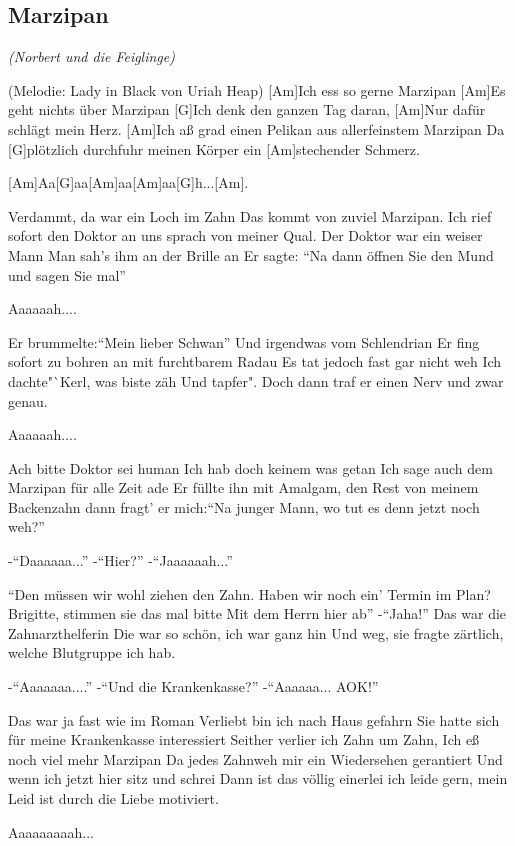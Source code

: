 \documentclass[a5paper,pagesize,twoside,10pt,headings=small]{scrreprt}
\newcommand\songheader[3][]{%
  \clearpage%
    \subsection*{\centering #2}\vspace{0.5\baselineskip}%
    \addcontentsline{toc}{subsection}{#2}
    \centering \textit{#3}\\%
    \vspace{\baselineskip}\par%
}
\begin{document}
\songheader{Marzipan}{(Norbert und die Feiglinge)}
\begin{guitar}
{\tiny(Melodie: Lady in Black von Uriah Heap)}
[Am]Ich ess so gerne Marzipan
[Am]Es geht nichts über Marzipan
[G]Ich denk den ganzen Tag daran,
[Am]Nur dafür schlägt mein Herz.
[Am]Ich aß grad einen Pelikan aus allerfeinstem Marzipan
Da [G]plötzlich durchfuhr meinen Körper ein [Am]stechender Schmerz.

[Am]Aa[G]aa[Am]aa[Am]aa[G]h...[Am].

Verdammt, da war ein Loch im Zahn
Das kommt von zuviel Marzipan.
Ich rief sofort den Doktor an uns sprach von meiner Qual.
Der Doktor war ein weiser Mann
Man sah's ihm an der Brille an
Er sagte: "`Na dann öffnen Sie den Mund und sagen Sie mal"'

Aaaaaah....

Er brummelte:"`Mein lieber Schwan"'
Und irgendwas vom Schlendrian
Er fing sofort zu bohren an mit furchtbarem Radau
Es tat jedoch fast gar nicht weh
Ich dachte"`Kerl, was biste zäh
Und tapfer". Doch dann traf er einen Nerv und zwar genau.

Aaaaaah....

Ach bitte Doktor sei human
Ich hab doch keinem was getan
Ich sage auch dem Marzipan für alle Zeit ade
Er füllte ihn mit Amalgam, den Rest von meinem Backenzahn
dann fragt' er mich:"`Na junger Mann, wo tut es denn jetzt noch weh?"'

-"`Daaaaaa..."'
-"`Hier?"'
-"`Jaaaaaah..."'

"`Den müssen wir wohl ziehen den Zahn.
Haben wir noch ein' Termin im Plan?
Brigitte, stimmen sie das mal bitte
Mit dem Herrn hier ab"' -"`Jaha!"'
Das war die Zahnarzthelferin
Die war so schön, ich war ganz hin
Und weg, sie fragte zärtlich, welche Blutgruppe ich hab.

-"`Aaaaaaa...."'
-"`Und die Krankenkasse?"'
-"`Aaaaaa... AOK!"'

Das war ja fast wie im Roman
Verliebt bin ich nach Haus gefahrn
Sie hatte sich für meine Krankenkasse interessiert
Seither verlier ich Zahn um Zahn,
Ich eß noch viel mehr Marzipan
Da jedes Zahnweh mir ein Wiedersehen gerantiert
Und wenn ich jetzt hier sitz und schrei
Dann ist das völlig einerlei
ich leide gern, mein Leid ist durch die Liebe motiviert.

Aaaaaaaaah...
\end{guitar}
\end{document}

